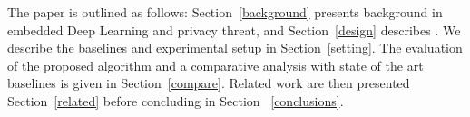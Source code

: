The paper is outlined as follows: Section~\ref{background} presents background in embedded Deep Learning and privacy threat, and Section~\ref{design} describes \method\hspace{0.02in}.
We describe the baselines and experimental setup in Section~\ref{setting}.
The evaluation of the proposed algorithm and a comparative analysis with state of the art baselines is given in Section~\ref{compare}.
Related work are then presented Section~\ref{related} before concluding in Section ~\ref{conclusions}.
